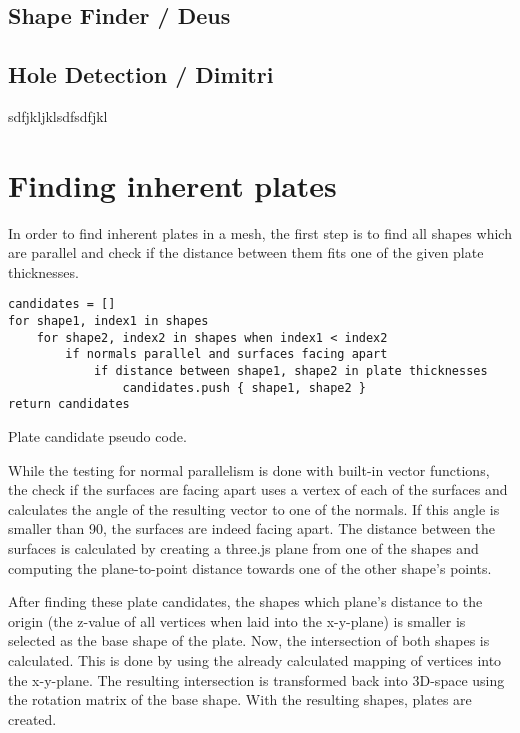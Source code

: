 \documentclass[../ClassicThesis.tex]{subfiles}
\begin{document}
\subsection{Shape Finder / Deus}



\subsection{Hole Detection / Dimitri}

sdfjkljklsdfsdfjkl

\section{Finding inherent plates}

In order to find inherent plates in a mesh, the first step is to find all shapes which are parallel and check if the distance between them fits one of the given plate thicknesses.

\begin{listing}[ht]
\begin{verbatim}
candidates = []
for shape1, index1 in shapes
    for shape2, index2 in shapes when index1 < index2
        if normals parallel and surfaces facing apart
            if distance between shape1, shape2 in plate thicknesses
                candidates.push { shape1, shape2 }
return candidates
\end{verbatim}
\caption{Plate candidate pseudo code.}
\label{lst:coffeescript}
\end{listing}

While the testing for normal parallelism is done with built-in vector functions, the check if the surfaces are facing apart uses a vertex of each of the surfaces and calculates the angle of the resulting vector to one of the normals. If this angle is smaller than 90\textdegree, the surfaces are indeed facing apart. The distance between the surfaces is calculated by creating a three.js plane from one of the shapes and computing the plane-to-point distance towards one of the other shape's points.

After finding these plate candidates, the shapes which plane's distance to the origin (the z-value of all vertices when laid into the x-y-plane) is smaller is selected as the base shape of the plate. Now, the intersection of both shapes is calculated. This is done by using the already calculated mapping of vertices into the x-y-plane. The resulting intersection is transformed back into 3D-space using the rotation matrix of the base shape. With the resulting shapes, plates are created.
\end{document}
